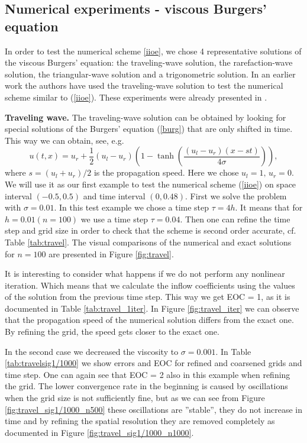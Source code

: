 \documentclass[../include.tex]{subfiles}
\begin{document}
\subsection{Numerical experiments - viscous Burgers' equation}
In order to test the numerical scheme \eqref{iioe}, we chose 4 representative solutions of the viscous Burgers' equation:
the traveling-wave solution, the rarefaction-wave solution, the triangular-wave solution and a trigonometric solution. In an earlier work \cite{iioe0} the authors have used the traveling-wave solution to test the numerical scheme similar to (\ref{iioe}). These experiments were already presented in \cite{algoritmy}.

\textbf{Traveling wave.} The traveling-wave solution can be obtained by looking for special solutions of the Burgers' equation (\ref{burg}) that are only shifted in time. This way we can obtain, see, e.g.\ \cite{olv}
\begin{equation}
	u(t,x) = u_r + \frac{1}{2}(u_l-u_r)\left(1-\tanh \left(\frac{(u_l-u_r)(x-st)}{4 \sigma}\right) \right),
	\label{travel}
\end{equation}
where $ s = (u_l + u_r)/2 $ is the propagation speed. Here we chose $ u_l = 1,\,u_r = 0 $. We will use it as our first example to test the numerical scheme (\ref{iioe}) on space interval $ (-0.5, 0.5) $ and time interval $ (0, 0.48) $.
First we solve the problem with $ \sigma = 0.01 $.
In this test example we chose a time step $ \tau = 4h $. It means that for $ h = 0.01 (n = 100) $ we use a time step $ \tau = 0.04 $. Then one can refine the time step and grid size in order to check that the scheme is second order accurate, cf. Table \ref{tab:travel}. The visual comparisons of the numerical and exact solutions for $ n = 100 $ are presented in Figure \ref{fig:travel}.

It is interesting to consider what happens if we do not perform any nonlinear iteration. Which means that we calculate the inflow coefficients using the values of the solution from the previous time step. This way we get EOC = 1, as it is documented in Table \ref{tab:travel_1iter}. In Figure \ref{fig:travel_iter} we can observe that the propagation speed of the numerical solution differs from the exact one. By refining the grid, the speed gets closer to the exact one.

In the second case we decreased the viscosity to $ \sigma = 0.001 $. In Table \ref{tab:travelsig1/1000} we show errors and EOC for refined and coarsened grids and time step. One can again see that EOC = 2 also in this example when refining the grid. The lower convergence rate in the beginning is caused by oscillations when the grid size is not sufficiently fine, but as we can see from Figure \ref{fig:travel_sig1/1000_n500} these oscillations are ”stable”, they do not increase in time and
by refining the spatial resolution they are removed completely as documented in Figure \ref{fig:travel_sig1/1000_n1000}.
\end{document}
